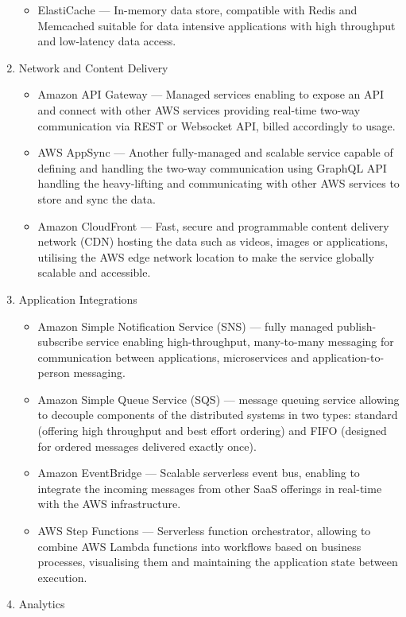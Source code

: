 \begin{enumerate}
\begin{itemize}
       \item ElastiCache --- In-memory data store, compatible with Redis and Memcached suitable for data intensive applications with high throughput and low-latency data access.
   \end{itemize}
   \item Network and Content Delivery
   \begin{itemize}
       \item Amazon API Gateway --- Managed services enabling to expose an API and connect with other AWS services providing real-time two-way communication via REST or Websocket API, billed accordingly to usage.
       \item AWS AppSync --- Another fully-managed and scalable service capable of defining and handling the two-way communication using GraphQL API handling the heavy-lifting and communicating with other AWS services to store and sync the data.
       \item Amazon CloudFront --- Fast, secure and programmable content delivery network (CDN) hosting the data such as videos, images or applications, utilising the AWS edge network location to make the service globally scalable and accessible.
   \end{itemize}
   \item Application Integrations
   \begin{itemize}
       \item Amazon Simple Notification Service (SNS) --- fully managed publish-subscribe service enabling high-throughput, many-to-many messaging for communication between applications, microservices and application-to-person messaging.
       \item Amazon Simple Queue Service (SQS) --- message queuing service allowing to decouple components of the distributed systems in two types: standard (offering high throughput and best effort ordering) and FIFO (designed for ordered messages delivered exactly once).
       \item Amazon EventBridge --- Scalable serverless event bus, enabling to integrate the incoming messages from other SaaS offerings in real-time with the AWS infrastructure.
       \item AWS Step Functions --- Serverless function orchestrator, allowing to combine AWS Lambda functions into workflows based on business processes, visualising them and maintaining the application state between execution.
   \end{itemize}
   \item Analytics

\end{enumerate}
